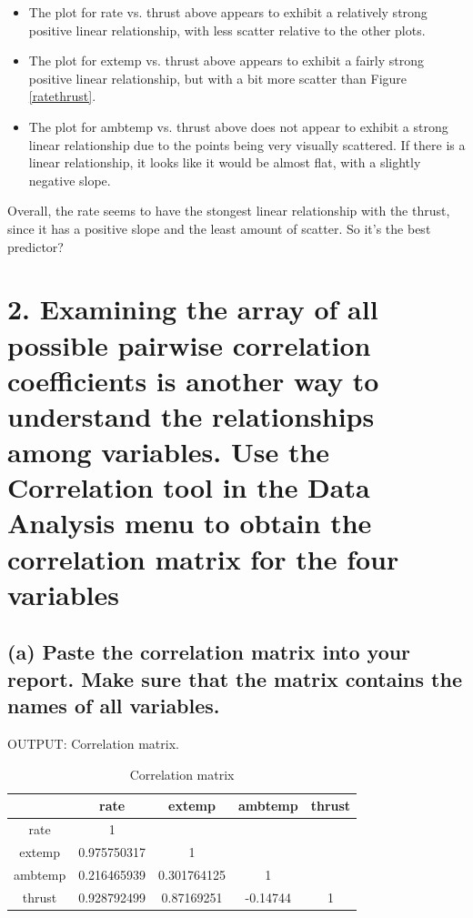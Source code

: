 \documentclass[letterpaper]{article}
\begin{document}
\begin{itemize}
 \item The plot for rate vs. thrust above appears to exhibit a relatively strong positive
       linear relationship, with less scatter relative to the other plots.
 \item The plot for extemp vs. thrust above appears to exhibit a fairly strong positive
       linear relationship, but with a bit more scatter than Figure \ref{ratethrust}.
 \item The plot for ambtemp vs. thrust above does not appear to exhibit a strong linear
       relationship due to the points being very visually scattered.
       If there is a linear relationship, it looks like it would be almost flat,
       with a slightly negative slope.
\end{itemize}

Overall, the rate seems to have the stongest linear relationship with the thrust,
since it has a positive slope and the least amount of scatter.
So it's the best predictor?

\section{2.	Examining the array of all possible pairwise correlation coefficients is another way to understand the relationships among variables. Use the Correlation tool in the Data Analysis menu to obtain the correlation matrix for the four variables}

\subsection{(a)	Paste the correlation matrix into your report. Make sure that the matrix contains the names of all variables.}
OUTPUT: Correlation matrix.

\begin{table}[H]
 \centering
 \begin{tabular}{c|c|c|c|c|}
          & rate        & extemp      & ambtemp  & thrust \\ \hline
  rate    & 1           &             &          &        \\ \hline
  extemp  & 0.975750317 & 1           &          &        \\ \hline
  ambtemp & 0.216465939 & 0.301764125 & 1        &        \\ \hline
  thrust  & 0.928792499 & 0.87169251  & -0.14744 & 1      \\ \hline
 \end{tabular}
 \caption{Correlation matrix}
 \label{correlationmatrix}
\end{table}
\end{document}
